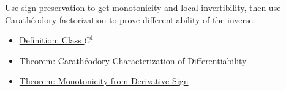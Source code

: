 \begin{remark*}
Use sign preservation to get monotonicity and local invertibility, then use Carath\'{e}odory factorization to prove differentiability of the inverse.
\end{remark*}

\begin{dependencies}
\begin{itemize}
  \item \hyperref[def:class-c1]{Definition: Class \(C^1\)}
  \item \hyperref[thm:caratheodory-characterization-of-differentiability]{Theorem: Carath\'{e}odory Characterization of Differentiability}
  \item \hyperref[thm:nondecreasing-iff-nonneg-derivative]{Theorem: Monotonicity from Derivative Sign}
\end{itemize}
\end{dependencies}

\clearpage

